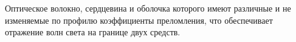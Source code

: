 Оптическое волокно, сердцевина и оболочка которого имеют
различные и не изменяемые по профилю коэффициенты 
преломления, что обеспечивает отражение волн света на границе
двух средств.